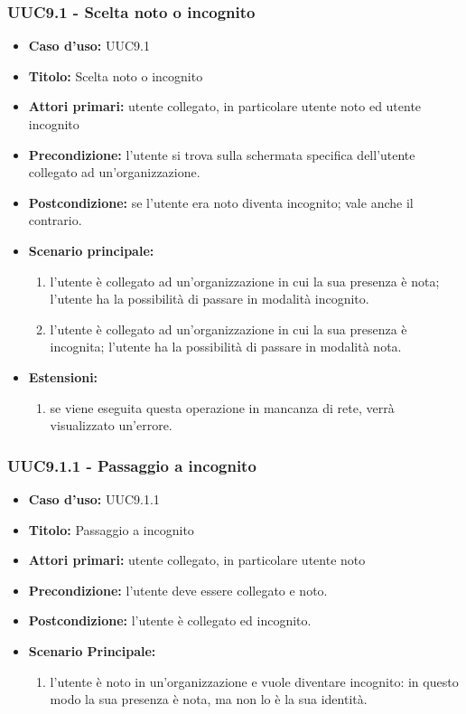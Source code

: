 \documentclass[casi-duso]{subfiles}
\begin{document}
\subsubsection{UUC9.1 - Scelta noto o incognito}
\label{subsub:UUC9.1utente}
\begin{itemize}
  \item \textbf{Caso d’uso:} UUC9.1
  \item \textbf{Titolo:} Scelta noto o incognito
  \item \textbf{Attori primari:} utente collegato, in particolare utente noto ed utente incognito
  \item \textbf{Precondizione:} l'utente si trova sulla schermata specifica dell'utente collegato ad un'organizzazione.
  \item \textbf{Postcondizione:} se l'utente era noto diventa incognito; vale anche il contrario.
  \item \textbf{Scenario principale:} 
  \begin{enumerate}
    \item l'utente è collegato ad un'organizzazione in cui la sua presenza è nota; l'utente ha la possibilità di passare in modalità incognito.
    \item l'utente è collegato ad un'organizzazione in cui la sua presenza è incognita; l'utente ha la possibilità di passare in modalità nota.
  \end{enumerate}
  \item \textbf{Estensioni:} 
  \begin{enumerate}
    \item se viene eseguita questa operazione in mancanza di rete, verrà visualizzato un'errore. 
  \end{enumerate}  
\end{itemize}

\subsubsection{UUC9.1.1 - Passaggio a incognito}
\label{subsub:UUC9.1.1utente}
\begin{itemize}
  \item \textbf{Caso d’uso:} UUC9.1.1
  \item \textbf{Titolo:} Passaggio a incognito
  \item \textbf{Attori primari:} utente collegato, in particolare utente noto
  \item \textbf{Precondizione:} l'utente deve essere collegato e noto.
  \item \textbf{Postcondizione:} l'utente è collegato ed incognito.
  \item \textbf{Scenario Principale:}
  \begin{enumerate}
    \item l'utente è noto in un'organizzazione e vuole diventare incognito: in questo modo la sua presenza è nota, ma non lo è la sua identità.
  \end{enumerate}
\end{itemize}
\end{document}
